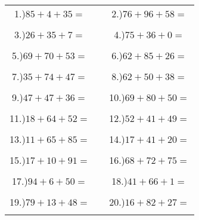 \documentclass{article}
\begin{document}
\begin{tabular}{ccc}
1.)$85+4+35=$& \hspace{5cm} &2.)$76+96+58=$\\\\
3.)$26+35+7=$& \hspace{5cm} &4.)$75+36+0=$\\\\
5.)$69+70+53=$& \hspace{5cm} &6.)$62+85+26=$\\\\
7.)$35+74+47=$& \hspace{5cm} &8.)$62+50+38=$\\\\
9.)$47+47+36=$& \hspace{5cm} &10.)$69+80+50=$\\\\
11.)$18+64+52=$& \hspace{5cm} &12.)$52+41+49=$\\\\
13.)$11+65+85=$& \hspace{5cm} &14.)$17+41+20=$\\\\
15.)$17+10+91=$& \hspace{5cm} &16.)$68+72+75=$\\\\
17.)$94+6+50=$& \hspace{5cm} &18.)$41+66+1=$\\\\
19.)$79+13+48=$& \hspace{5cm} &20.)$16+82+27=$\\\\
\end{tabular}
\newpage
\end{document}
